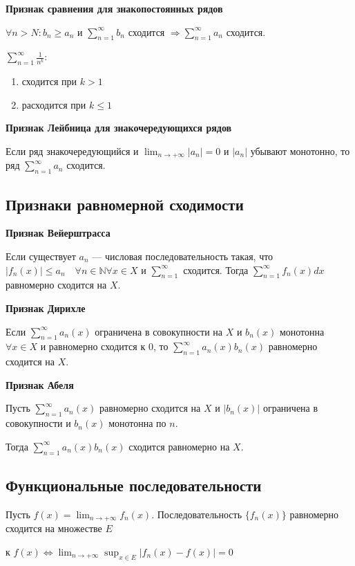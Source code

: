 \documentclass[a4paper]{article}
\begin{document}
\begin{hproof}\textbf{Признак сравнения для знакопостоянных рядов}

$ \forall n > N: b_n \geq a_n$ и $\sum_{n=1}^\infty b_n$ сходится $\Rightarrow \sum_{n=1}^\infty a_n$ сходится.

$\sum_{n=1}^\infty \frac{1}{n^k}$:
\begin{enumerate}
\item сходится при $k>1$
\item расходится при $k \leq 1$
\end{enumerate}
\end{hproof}

\begin{hproof}\textbf{Признак Лейбница для знакочередующихся рядов}

Если ряд знакочередующийся и $\lim_{n \rightarrow + \infty} |a_n| = 0$ и $|a_n|$ убывают монотонно, то ряд $\sum_{n=1}^{\infty} a_n$ сходится.
\end{hproof}

\subsection*{Признаки равномерной сходимости}

\begin{hproof}\textbf{Признак Вейерштрасса}


Если существует $a_n$ --- числовая последовательность такая, что $|f_n(x)| \leq a_n \quad \forall n \in \mathbb{N} \forall x \in X$ и $\sum_{n=1}^\infty$ сходится. Тогда $\sum_{n=1}^\infty f_n(x)dx$ равномерно сходится на $X$.
\end{hproof}

\begin{hproof}\textbf{Признак Дирихле}

Если $\sum_{n=1}^\infty a_n(x)$ ограничена в совокупности на $X$ и $b_n(x)$ монотонна $\forall x \in X$ и равномерно сходится к 0, то $\sum_{n=1}^\infty a_n(x)b_n(x)$ равномерно сходится на $X$.


\end{hproof}

\begin{hproof}\textbf{Признак Абеля}

Пусть $\sum_{n=1}^\infty a_n(x)$ равномерно сходится на $X$ и $|b_n(x)|$ ограничена в совокупности и $b_n(x)$ монотонна по $n$. 

Тогда $\sum_{n=1}^\infty a_n(x)b_n(x)$ сходится равномерно на $X$.
\end{hproof}

\subsection*{Функциональные последовательности}

\begin{hproof}
Пусть  $f(x) = \lim_{n \rightarrow + \infty} f_n(x)$.
Последовательность $\{ f_n(x) \}$ равномерно сходится на множестве $E$ 

к $f(x) \Leftrightarrow \lim_{n \rightarrow +\infty} \sup_{x \in E} |f_n(x) - f(x)| = 0$
\end{hproof}
\end{document}
